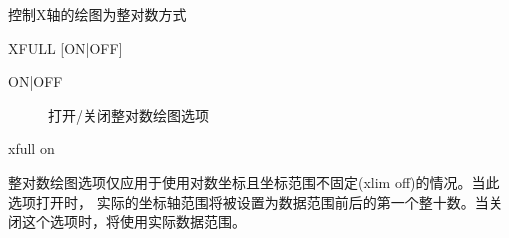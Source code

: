\label{cmd:xfull}

控制X轴的绘图为整对数方式

\begin{SACSTX}
XFULL [ON|OFF]
\end{SACSTX}

\begin{description}
\item [ON|OFF] 打开/关闭整对数绘图选项
\end{description}

\begin{SACDFT}
xfull on
\end{SACDFT}

整对数绘图选项仅应用于使用对数坐标且坐标范围不固定(xlim off)的情况。当此选项打开时，
实际的坐标轴范围将被设置为数据范围前后的第一个整十数。当关闭这个选项时，将使用实际数据范围。

